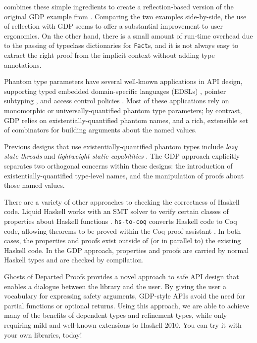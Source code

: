 \documentclass[format=sigplan, review=false, screen=true, 10pt]{acmart}
\makeatletter
\let\origsection\section
\renewcommand\section{\@ifstar{\starsection}{\nostarsection}}
\newcommand\nostarsection[1]
{\sectionprelude\origsection{#1}\sectionpostlude}
\newcommand\starsection[1]
{\sectionprelude\origsection*{#1}\sectionpostlude}
\newcommand\sectionprelude{%
  \vspace{-0.5em}
}
\newcommand\sectionpostlude{%
  \vspace{0em}
}
\makeatother
\begin{document}
 combines these simple ingredients to create a reflection-based version of the original GDP example
from . Comparing the two examples side-by-side, the use of reflection with GDP seems to offer a
substantial improvement to user ergonomics.
 On the other hand, there is a small amount of run-time overhead due to the passing of
typeclass dictionaries for \texttt{Fact}s, and it is not always easy to extract the right
proof from the implicit context without adding type annotations.

\section{Related Work}
Phantom type parameters have several well-known applications in API design, supporting typed
embedded domain-specific languages (EDSLs) \cite{Leijen:1999:DSE:1267936.1267945}, pointer subtyping \cite{Leijen:2004:WPC:1017472.1017483}, and access control policies \cite{Fluet:2006:PTS:1180085.1180088}. Most of these applications
rely on monomorphic or universally-quantified phantom type parameters; by contrast, GDP relies on existentially-quantified
phantom names, and a rich, extensible set of combinators for building arguments about the named values.

Previous designs that use existentially-quantified phantom types include \emph{lazy state threads} \cite{launchbury1994lazy} and \emph{lightweight static capabilities} \cite{kiselyov2006lightweight}. The GDP approach explicitly separates two orthogonal concerns within these designs: the introduction of existentially-quantified type-level names, and the manipulation of proofs about those named values.

There are a variety of other approaches to checking the correctness of Haskell code. Liquid Haskell works with an SMT solver to verify
certain classes of properties about Haskell functions \cite{vazou2016liquid}. \texttt{hs-to-coq} converts Haskell code to
Coq code, allowing theorems to be proved within the Coq proof assistant \cite{spector2018total}. In both cases, the properties and proofs exist
outside of (or in parallel to) the existing Haskell code. In the GDP approach, properties and proofs are carried by
normal Haskell types and are checked by compilation.


\section{Summary}
Ghosts of Departed Proofs provides a novel approach to safe API design  that enables
a dialogue between the library and the user. By giving the user a vocabulary for expressing
safety arguments, GDP-style APIs avoid
the need for partial functions or optional returns. Using this approach, we are able to achieve
many of the benefits of dependent types and refinement types, while only requiring mild
and well-known extensions to Haskell 2010. 
You can try it with your own libraries, today!
\end{document}
